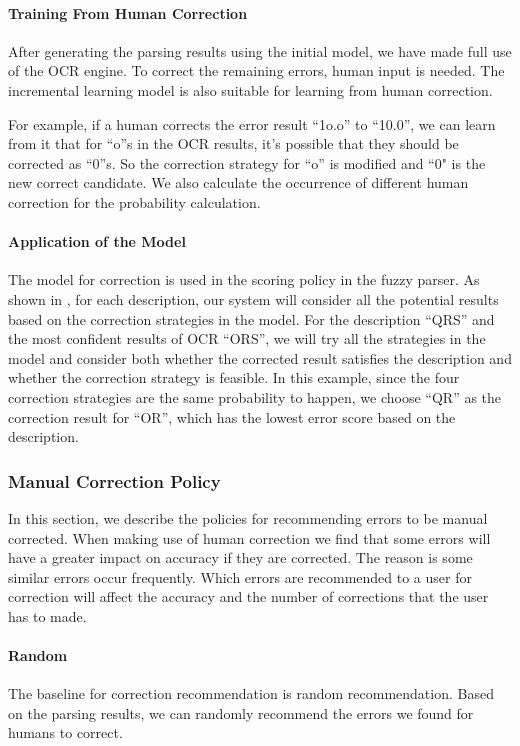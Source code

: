 \paragraph{Training From Human Correction}
After generating the parsing results using the initial model, we have 
made full use of the OCR engine. To correct the remaining errors, 
human input is needed. The incremental learning model is also suitable 
for learning from human correction. 

For example, if a human corrects the error result ``1o.o'' to ``10.0'', 
we can learn from it that for ``o''s in the OCR results, it's possible that 
they should be corrected as ``0''s. So the correction strategy 
for ``o'' is modified and ``0" is the new correct candidate. 
We also calculate the occurrence 
of different human correction for the probability calculation. 

\paragraph{Application of the Model}
The model for correction is used in the scoring policy in the 
fuzzy parser. As shown in , for each 
description, our system will consider all the potential  
results based on the correction strategies in the model. 
For the description ``QRS'' and the most confident results 
of OCR ``ORS'', we will try all the strategies in the model 
and consider both whether the corrected result satisfies the 
description and whether the correction strategy is 
feasible. In this example, since the four correction strategies 
are the same probability to happen, we choose ``QR'' as the correction 
result for ``OR'', 
which has the lowest error score based on the description.  

\subsubsection{Manual Correction Policy}
In this section, we describe the policies for recommending 
errors to be manual corrected. When making use of human correction 
we find that some errors will have a greater impact on 
accuracy if they are corrected. The reason is some similar errors 
occur frequently. Which errors are recommended to a user 
for correction will affect the accuracy and the 
number of corrections that the user has to made. 

\paragraph{Random}
The baseline for correction recommendation is random 
recommendation. Based on the parsing results, we can randomly 
recommend the errors we found for humans to correct.  

